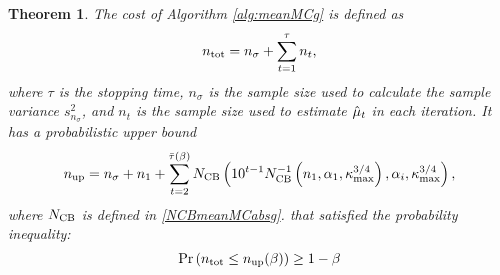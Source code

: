 \documentclass{iitthesis}
\newtheorem{theorem}{Theorem}[section]
\theoremstyle{definition}
\begin{document}
\begin{theorem}\label{cost:meanMCg}
The cost of Algorithm \ref{alg:meanMCg} is defined as $$n_{\operatorname{tot}}= n_{\sigma}+\sum_{t=1}^\tau n_t,$$ 
where $\tau$ is the stopping time, $n_\sigma$ is the sample size used to calculate the sample variance $s_{n_\sigma}^2$, and $n_t$ is the sample size used to estimate $\hat{\mu}_t$ in each iteration. It has a probabilistic upper bound  $$n_{\operatorname{up}}=n_\sigma+ n_1+\sum_{t=2}^{\bar{\tau}(\beta)} N_{\text{CB}}\left(10^{t-1}N_{\text{CB}}^{-1}\left(n_1,\alpha_1,\kappa_{\max}^{3/4}\right),\alpha_i,\kappa_{\max}^{3/4}\right),$$
where $N_{\text{CB}}$ is defined in \eqref{NCBmeanMCabsg}.
that satisfied the probability inequality:
\begin{equation}
\Pr \left(n_{\operatorname{tot}}\leq n_{\operatorname{up}} (\beta)\right) \geq 1-\beta
\end{equation}
\end{theorem}
\end{document}
